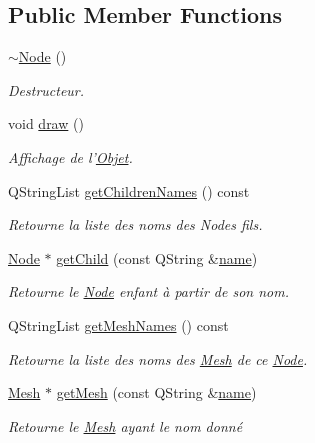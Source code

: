 \subsection*{Public Member Functions}
\begin{DoxyCompactItemize}
\item 
\hyperlink{class_node_aa0840c3cb5c7159be6d992adecd2097c}{$\sim$\+Node} ()
\begin{DoxyCompactList}\small\item\em Destructeur. \end{DoxyCompactList}\item 
void \hyperlink{class_node_ab88c83ced58700a56de568f5b1e3c473}{draw} ()
\begin{DoxyCompactList}\small\item\em Affichage de l'\hyperlink{class_objet}{Objet}. \end{DoxyCompactList}\item 
Q\+String\+List \hyperlink{class_node_af7d6e2eab0af346f6690b4a2db12d953}{get\+Children\+Names} () const 
\begin{DoxyCompactList}\small\item\em Retourne la liste des noms des Nodes fils. \end{DoxyCompactList}\item 
\hyperlink{class_node}{Node} $\ast$ \hyperlink{class_node_afdc8a8f6c370f437037c85ffea5af4c1}{get\+Child} (const Q\+String \&\hyperlink{class_objet_a4a702c189bedcbf1e65da6aec72c8e44}{name})
\begin{DoxyCompactList}\small\item\em Retourne le \hyperlink{class_node}{Node} enfant à partir de son nom. \end{DoxyCompactList}\item 
Q\+String\+List \hyperlink{class_node_a4a3bbcabcbd5423c297e287dd0ab7ecd}{get\+Mesh\+Names} () const 
\begin{DoxyCompactList}\small\item\em Retourne la liste des noms des \hyperlink{class_mesh}{Mesh} de ce \hyperlink{class_node}{Node}. \end{DoxyCompactList}\item 
\hyperlink{class_mesh}{Mesh} $\ast$ \hyperlink{class_node_a47c225bb649c6d44763661f6e3253c7c}{get\+Mesh} (const Q\+String \&\hyperlink{class_objet_a4a702c189bedcbf1e65da6aec72c8e44}{name})
\begin{DoxyCompactList}\small\item\em Retourne le \hyperlink{class_mesh}{Mesh} ayant le nom donné \end{DoxyCompactList}\item 

\end{DoxyCompactItemize}
